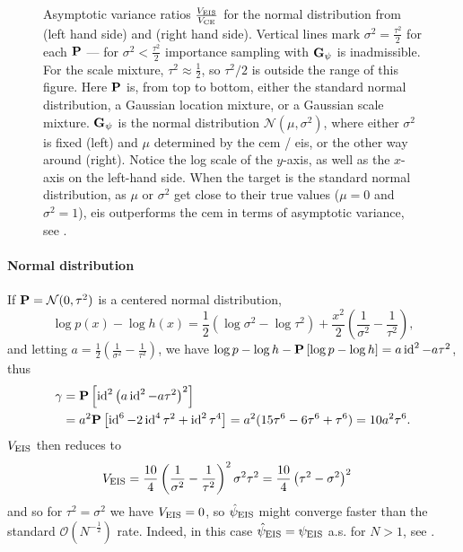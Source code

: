 \begin{example}
\begin{figure}
        \resizebox{\textwidth}{!}{%
        }
        \caption{Asymptotic variance ratios $\frac{V_{\eis}}{V_{\ce}}$ for the normal distribution from  (left hand side) and  (right hand side). Vertical lines mark $\sigma^{2} = \frac{\tau^{2}}{2}$ for each $\P$ --- for $\sigma^{2} < \frac{\tau^{2}}{2}$ importance sampling with $\G_{\psi}$ is inadmissible. For the scale mixture, $\tau^{2} \approx \frac12$, so $\tau^{2}/2$ is outside the range of this figure. Here $\P$ is, from top to bottom, either the standard normal distribution, a Gaussian location mixture, or a Gaussian scale mixture. $\G_{\psi}$ is the normal distribution $\mathcal N(\mu, \sigma^{2})$, where either $\sigma^{2}$ is fixed (left) and $\mu$ determined by the \gls{cem} / \gls{eis}, or the other way around (right). Notice the log scale of the $y$-axis, as well as the $x$-axis on the left-hand side. When the target is the standard normal distribution, as $\mu$ or $\sigma^{2}$ get close to their true values ($\mu = 0$ and $\sigma^{2} = 1$), \gls{eis} outperforms the \gls{cem} in terms of asymptotic variance, see . }
        \label{fig:are}
    \end{figure}

    
    \paragraph{Normal distribution}
    If $\P = \mathcal N(0, \tau^{2})$ is a centered normal distribution, 
    $$
        \log p(x) - \log h(x) = \frac{1}{2}(\log \sigma^{2} - \log \tau^{2}) + \frac{x^{2}}{2}\left(\frac{1}{\sigma^{2}} - \frac{1}{\tau^{2}} \right),
    $$ 
    and letting $a= \frac{1}{2} \left( \frac{1}{\sigma^{2}} - \frac{1}{\tau^{2}} \right)$, we have $\log p - \log h - \P \left[ \log p - \log h \right] = a \id ^{2} - a\tau^{2}$, thus
    \begin{align*}
        \gamma &= \P \left[ \id^{2} \left( a \id^{2} - a \tau^{2}\right)^{2} \right] \\
            &= a^{2}\P \left[\id^{6} - 2\id^{4}\tau^{2} + \id^{2}\tau^{4}   \right] = a^{2} (15 \tau^{6} - 6 \tau^{6} + \tau^{6}) = 10 a^{2} \tau^{6}.
    \end{align*}
    $V_{\eis}$ then reduces to
    \begin{align*}
        V_{\eis} &= \frac{10}{4} \left( \frac{1}{\sigma^{2}} - \frac{1}{\tau^{2}} \right)^{2}\sigma^{2}\tau^{2} = \frac{10}{4} \left( \tau^{2} - \sigma^2 \right)^{2}
    \end{align*}
    and so for $\tau^{2} = \sigma^{2}$ we have $V_{\eis} = 0$, so $\hpeis$ might converge faster than the standard $\mathcal O( N^{-\frac{1}{2}})$ rate. Indeed, in this case $\hpeis = \peis$ a.s. for $N > 1$, see .


\end{example}
